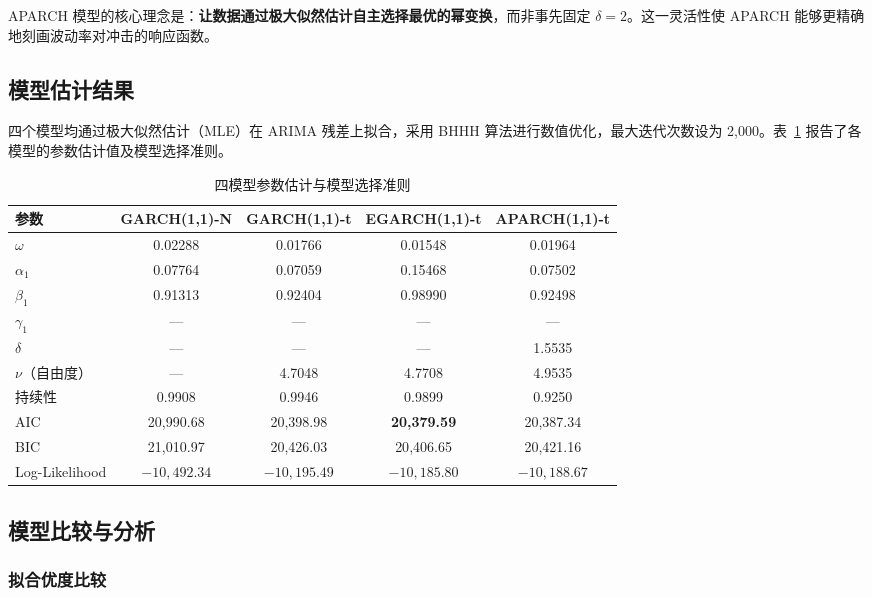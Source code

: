 \documentclass[12pt,a4paper]{article}
\begin{document}
APARCH 模型的核心理念是：\textbf{让数据通过极大似然估计自主选择最优的幂变换}，而非事先固定 $\delta = 2$。这一灵活性使 APARCH 能够更精确地刻画波动率对冲击的响应函数。

\subsection{模型估计结果}

四个模型均通过极大似然估计（MLE）在 ARIMA 残差上拟合，采用 BHHH 算法进行数值优化，最大迭代次数设为 2{,}000。表~\ref{tab:model_params} 报告了各模型的参数估计值及模型选择准则。

\begin{table}[H]
\centering
\caption{四模型参数估计与模型选择准则}
\label{tab:model_params}
\begin{tabular}{l c c c c}
\toprule
参数 & GARCH(1,1)-N & GARCH(1,1)-t & EGARCH(1,1)-t & APARCH(1,1)-t \\
\midrule
$\omega$       & 0.02288  & 0.01766  & 0.01548  & 0.01964 \\
$\alpha_1$     & 0.07764  & 0.07059  & 0.15468  & 0.07502 \\
$\beta_1$      & 0.91313  & 0.92404  & 0.98990  & 0.92498 \\
$\gamma_1$     & ---      & ---      & ---      & --- \\
$\delta$       & ---      & ---      & ---      & 1.5535 \\
$\nu$（自由度）& ---      & 4.7048   & 4.7708   & 4.9535 \\
持续性        & 0.9908   & 0.9946   & 0.9899   & 0.9250 \\
\midrule
AIC           & 20{,}990.68 & 20{,}398.98 & \textbf{20{,}379.59} & 20{,}387.34 \\
BIC           & 21{,}010.97 & 20{,}426.03 & 20{,}406.65 & 20{,}421.16 \\
Log-Likelihood & $-10{,}492.34$ & $-10{,}195.49$ & \textbf{$-10{,}185.80$} & $-10{,}188.67$ \\
\bottomrule
\end{tabular}
\end{table}

\subsection{模型比较与分析}

\subsubsection{拟合优度比较}
\end{document}
